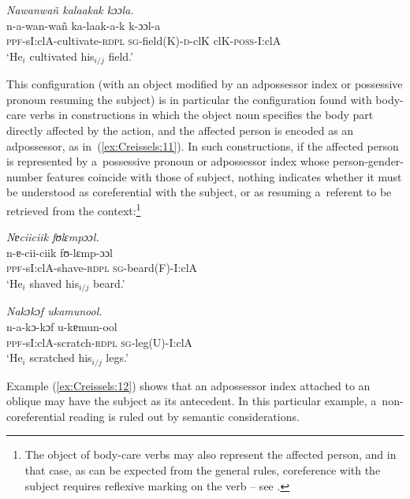 \documentclass[output=paper]{langscibook}
\begin{document}
\ea
  \label{ex:Creissels:10}
  
    \textit{Nawanwañ kalaakak kɔɔla.}\\
    \gll n-a-wan-wañ ka-laak-a-k k-ɔɔl-a\\
    \textsc{ppf}-sI:clA-cultivate-\textsc{rdpl} \textsc{sg}-field(K)-\textsc{d}-clK clK-\textsc{poss}-I:clA\\
    \glt `He$_i$ cultivated his$_{i/j}$ field.'
\z

This configuration (with an object modified by an adpossessor index or
possessive pronoun resuming the subject) is in particular the configuration
found with body-care verbs in constructions in which the object noun specifies
the body part directly affected by the action, and the affected person is
encoded as an adpossessor, as in~(\ref{ex:Creissels:11}).  In such constructions, if
the affected person is represented by a~possessive pronoun or adpossessor index
whose person-gender-number features coincide with those of subject, nothing
indicates whether it must be understood as coreferential with the subject, or
as resuming a~referent to be retrieved from the context:\footnote{ The object
  of body-care verbs may also represent the affected person, and in that case,
  as can be expected from the general rules, coreference with the subject
  requires reflexive marking on the verb -- see . }

\ea
  \label{ex:Creissels:11}
  
    \ea\label{ex:Creissels:11a}
    
      \textit{Nɐciiciik fʊlɛmpɔɔl.}\\
      \gll n-ɐ-cii-ciik fʊ-lɛmp-ɔɔl\\
      \textsc{ppf}-sI:clA-shave-\textsc{rdpl} \textsc{sg}-beard(F)-I:clA\\
      \glt `He$_i$ shaved his$_{i/j}$ beard.'


    \ex\label{ex:Creissels:11b}
    
      \textit{Nakɔkɔf ukamunool.}\\
      \gll n-a-kɔ-kɔf u-kɐmun-ool\\
      \textsc{ppf}-sI:clA-scratch-\textsc{rdpl} \textsc{sg}-leg(U)-I:clA\\
      \glt `He$_i$ scratched his$_{i/j}$ legs.'

  \z
\z

Example (\ref{ex:Creissels:12}) shows that an adpossessor index attached to an
oblique may have the subject as its antecedent.  In this particular example,
a~non-coreferential reading is ruled out by semantic considerations.
\end{document}
